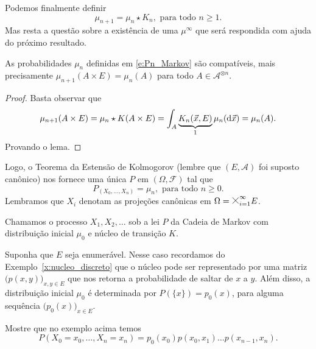 \begin{topics}
Podemos finalmente definir
\begin{equation}
  \label{e:Pn_Markov}
  \mu_{n+1} = \mu_n \star K_n, \text{ para todo $n \geq 1$}.
\end{equation}
Mas resta a questão sobre a existência de uma $\mu^\infty$ que será respondida com ajuda do próximo resultado.

\begin{lemma}
  As probabilidades $\mu_n$ definidas em \eqref{e:Pn_Markov} são compatíveis, mais precisamente $\mu_{n+1}(A \times E) = \mu_n(A)$ para todo $A \in \mathcal{A}^{\otimes n}$.
\end{lemma}

\begin{proof}
  Basta observar que
  \begin{equation}
    \mu_{n+1}(A \times E) = \mu_n \star K (A \times E) = \int_{A} \underbrace{K_n (\vec{x}, E)}_1 \mu_n(\mathop{}\!\mathrm{d} \vec{x}) = \mu_n(A).
  \end{equation}
  Provando o lema.
\end{proof}

Logo, o Teorema da Estensão de Kolmogorov (lembre que $(E, \mathcal{A})$ foi suposto canônico) nos fornece uma única $P$ em $(\Omega, \mathcal{F})$ tal que
\begin{equation}
   P_{(X_0, \dots, X_n)} = \mu_n, \text{ para todo $n \geq 0$}.
\end{equation}
Lembramos que $X_i$ denotam as projeções canônicas em $\Omega = \mtimes_{i=1}^\infty E$.

Chamamos o processo $X_1, X_2, \dots$ sob a lei $P$ da Cadeia de Markov  com distribuição inicial $\mu_0$ e núcleo de transição $K$.

\begin{example}
  \label{x:Markov_p_xy}
  Suponha que $E$ seja enumerável.
  Nesse caso recordamos do Exemplo~\ref{x:nucleo_discreto} que o núcleo pode ser representado por uma matriz $\big(p(x,y)\big)_{x,y \in E}$ que nos retorna a probabilidade de saltar de $x$ a $y$.
  Além disso, a distribuição inicial $\mu_0$ é determinada por $P(\{x\}) = p_0(x)$, para alguma sequência $\big(p_0(x)\big)_{x \in E}$.
\end{example}

\begin{exercise}
  Mostre que no exemplo acima temos
  \begin{equation}
    P(X_0 = x_0, \dots, X_n = x_n) = p_0(x_0) p(x_0, x_1) \dots p(x_{n-1}, x_n).
  \end{equation}
\end{exercise}


\end{topics}
